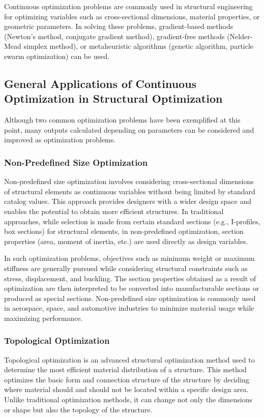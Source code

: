 Continuous optimization problems are commonly used in structural engineering for optimizing variables such as cross-sectional dimensions, material properties, or geometric parameters. In solving these problems, gradient-based methods (Newton's method, conjugate gradient method), gradient-free methods (Nelder-Mead simplex method), or metaheuristic algorithms (genetic algorithm, particle swarm optimization) can be used.

\subsection{General Applications of Continuous Optimization in Structural Optimization}
Although two common optimization problems have been exemplified at this point, many outputs calculated depending on parameters can be considered and improved as optimization problems.

\subsubsection{Non-Predefined Size Optimization}
Non-predefined size optimization involves considering cross-sectional dimensions of structural elements as continuous variables without being limited by standard catalog values. This approach provides designers with a wider design space and enables the potential to obtain more efficient structures. In traditional approaches, while selection is made from certain standard sections (e.g., I-profiles, box sections) for structural elements, in non-predefined optimization, section properties (area, moment of inertia, etc.) are used directly as design variables.

In such optimization problems, objectives such as minimum weight or maximum stiffness are generally pursued while considering structural constraints such as stress, displacement, and buckling. The section properties obtained as a result of optimization are then interpreted to be converted into manufacturable sections or produced as special sections. Non-predefined size optimization is commonly used in aerospace, space, and automotive industries to minimize material usage while maximizing performance.

\subsubsection{Topological Optimization}
Topological optimization is an advanced structural optimization method used to determine the most efficient material distribution of a structure. This method optimizes the basic form and connection structure of the structure by deciding where material should and should not be located within a specific design area. Unlike traditional optimization methods, it can change not only the dimensions or shape but also the topology of the structure.

